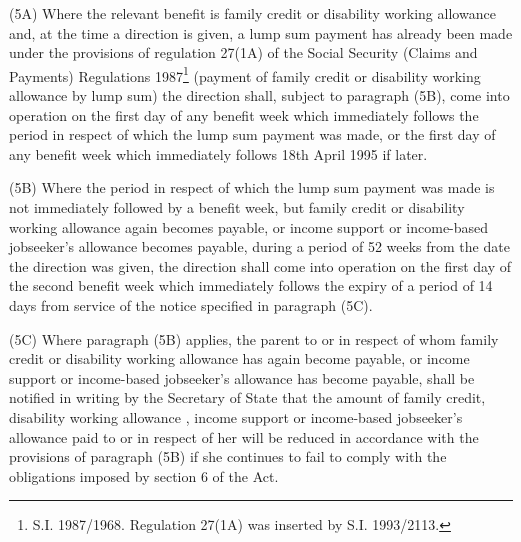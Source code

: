 \documentclass[a4paper,12pt]{article}
\begin{document}
(5A) Where the relevant benefit is family credit or disability working allowance and, at the time a direction is given, a lump sum payment has already been made under the provisions of regulation 27(1A) of the Social Security (Claims and Payments) Regulations 1987\footnote{\frenchspacing S.I. 1987/1968. Regulation 27(1A) was inserted by S.I. 1993/2113.} (payment of family credit or disability working allowance by lump sum) the direction shall, subject to paragraph (5B), come into operation on the first day of any benefit week which immediately follows the period in respect of which the lump sum payment was made, or the first day of any benefit week which immediately follows 18th April 1995 if later.

(5B) Where the period in respect of which the lump sum payment was made is not immediately followed by a benefit week, but family credit or disability working allowance again becomes payable, or income support 
or income-based jobseeker’s allowance  %
becomes payable, during a period of 52 weeks from the date the direction was given, the direction shall come into operation on the first day of the second benefit week which immediately follows the expiry of a period of 14 days from service of the notice specified in paragraph (5C).

(5C) Where paragraph (5B) applies, the parent to or in respect of whom family credit or disability working allowance has again become payable, or income support 
or income-based jobseeker’s allowance  %
has become payable, shall be notified in writing by 
the Secretary of State  %
that the amount of family credit, disability working allowance%
, income support or income-based jobseeker’s allowance  %
paid to or in respect of her will be reduced in accordance with the provisions of paragraph (5B) if she continues to fail to comply with the obligations imposed by section 6 of the Act.
\end{document}
